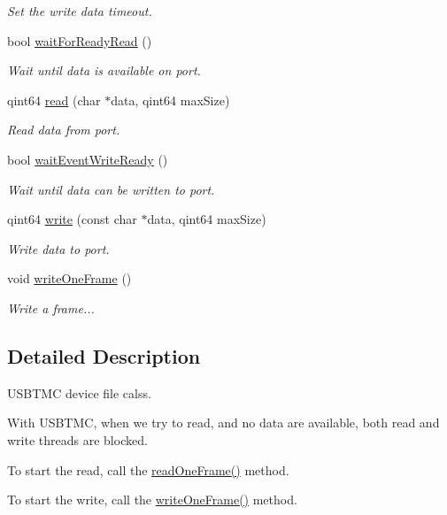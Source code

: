 \begin{DoxyCompactItemize}
\begin{DoxyCompactList}\small\item\em Set the write data timeout. \end{DoxyCompactList}\item 
bool \hyperlink{classmdt_usbtmc_port_a46efba4f2d3dbb3c917368323de0333b}{waitForReadyRead} ()
\begin{DoxyCompactList}\small\item\em Wait until data is available on port. \end{DoxyCompactList}\item 
qint64 \hyperlink{classmdt_usbtmc_port_a91f45336ca9a71284e0309182f5e8ca1}{read} (char $\ast$data, qint64 maxSize)
\begin{DoxyCompactList}\small\item\em Read data from port. \end{DoxyCompactList}\item 
bool \hyperlink{classmdt_usbtmc_port_aaa58100bc6ec2a5f91a3c6bb3676a468}{waitEventWriteReady} ()
\begin{DoxyCompactList}\small\item\em Wait until data can be written to port. \end{DoxyCompactList}\item 
qint64 \hyperlink{classmdt_usbtmc_port_a32b98d2a61617293c328a343d62d52c3}{write} (const char $\ast$data, qint64 maxSize)
\begin{DoxyCompactList}\small\item\em Write data to port. \end{DoxyCompactList}\item 
void \hyperlink{classmdt_usbtmc_port_a97fca5f136f232275d90ab5b8c5ce285}{writeOneFrame} ()
\begin{DoxyCompactList}\small\item\em Write a frame... \end{DoxyCompactList}\end{DoxyCompactItemize}


\subsection{Detailed Description}
USBTMC device file calss. 

With USBTMC, when we try to read, and no data are available, both read and write threads are blocked.\par
 To start the read, call the \hyperlink{classmdt_usbtmc_port_a86ee5e17c32dea75e9f918389d3f7afc}{readOneFrame()} method.\par
 To start the write, call the \hyperlink{classmdt_usbtmc_port_a97fca5f136f232275d90ab5b8c5ce285}{writeOneFrame()} method. 

